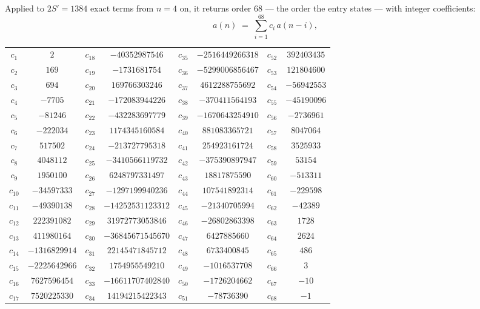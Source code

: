 \documentclass[11pt,a4paper]{article}
\theoremstyle{plain}
\theoremstyle{definition}
\begin{document}
Applied to $2S'=1384$ exact terms from $n=4$ on, it returns order $68$ --- the
order the entry states --- with integer coefficients:
\[
a(n)\;=\;\sum_{i=1}^{68}c_i\,a(n-i),
\]
\begin{center}\small
\begin{tabular}{cccccccc}
$c_{1}$ & $2$ & $c_{18}$ & $-40352987546$ & $c_{35}$ & $-2516449266318$ & $c_{52}$ & $392403435$ \\
$c_{2}$ & $169$ & $c_{19}$ & $-1731681754$ & $c_{36}$ & $-5299006856467$ & $c_{53}$ & $121804600$ \\
$c_{3}$ & $694$ & $c_{20}$ & $169766303246$ & $c_{37}$ & $4612288755692$ & $c_{54}$ & $-56942553$ \\
$c_{4}$ & $-7705$ & $c_{21}$ & $-172083944226$ & $c_{38}$ & $-370411564193$ & $c_{55}$ & $-45190096$ \\
$c_{5}$ & $-81246$ & $c_{22}$ & $-432283697779$ & $c_{39}$ & $-1670643254910$ & $c_{56}$ & $-2736961$ \\
$c_{6}$ & $-222034$ & $c_{23}$ & $1174345160584$ & $c_{40}$ & $881083365721$ & $c_{57}$ & $8047064$ \\
$c_{7}$ & $517502$ & $c_{24}$ & $-213727795318$ & $c_{41}$ & $254923161724$ & $c_{58}$ & $3525933$ \\
$c_{8}$ & $4048112$ & $c_{25}$ & $-3410566119732$ & $c_{42}$ & $-375390897947$ & $c_{59}$ & $53154$ \\
$c_{9}$ & $1950100$ & $c_{26}$ & $6248797331497$ & $c_{43}$ & $18817875590$ & $c_{60}$ & $-513311$ \\
$c_{10}$ & $-34597333$ & $c_{27}$ & $-1297199940236$ & $c_{44}$ & $107541892314$ & $c_{61}$ & $-229598$ \\
$c_{11}$ & $-49390138$ & $c_{28}$ & $-14252531123312$ & $c_{45}$ & $-21340705994$ & $c_{62}$ & $-42389$ \\
$c_{12}$ & $222391082$ & $c_{29}$ & $31972773053846$ & $c_{46}$ & $-26802863398$ & $c_{63}$ & $1728$ \\
$c_{13}$ & $411980164$ & $c_{30}$ & $-36845671545670$ & $c_{47}$ & $6427885660$ & $c_{64}$ & $2624$ \\
$c_{14}$ & $-1316829914$ & $c_{31}$ & $22145471845712$ & $c_{48}$ & $6733400845$ & $c_{65}$ & $486$ \\
$c_{15}$ & $-2225642966$ & $c_{32}$ & $1754955549210$ & $c_{49}$ & $-1016537708$ & $c_{66}$ & $3$ \\
$c_{16}$ & $7627596454$ & $c_{33}$ & $-16611707402840$ & $c_{50}$ & $-1726204662$ & $c_{67}$ & $-10$ \\
$c_{17}$ & $7520225330$ & $c_{34}$ & $14194215422343$ & $c_{51}$ & $-78736390$ & $c_{68}$ & $-1$ \\
\end{tabular}
\end{center}
\end{document}
